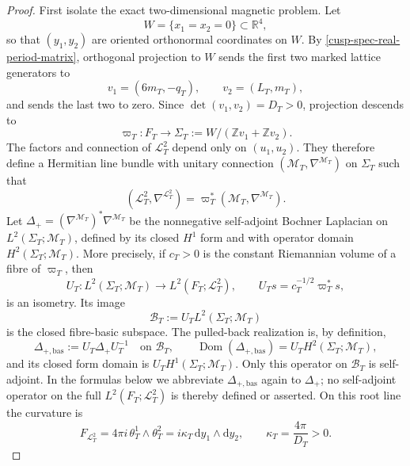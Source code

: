 \begin{proof}
First isolate the exact two-dimensional magnetic problem.  Let
\[
 W=\{x_1=x_2=0\}\subset\mathbb R^4,
\]
so that \((y_1,y_2)\) are oriented orthonormal coordinates on \(W\).
By \cref{cusp-spec-real-period-matrix}, orthogonal projection to \(W\)
sends the first two marked lattice generators to
\[
 v_1=(6m_T,-q_T),
 \qquad
 v_2=(L_T,m_T),
\]
and sends the last two to zero.  Since
\(\det(v_1,v_2)=D_T>0\), projection descends to
\[
 \varpi_T:F_T\longrightarrow
 \Sigma_T:=W/(\mathbb Zv_1+\mathbb Zv_2).
\]
The factors and connection of \(\mathscr L_T^2\) depend only on
\((u_1,u_2)\).  They therefore define a Hermitian line bundle with unitary
connection \((\mathscr M_T,\nabla^{\mathscr M_T})\) on \(\Sigma_T\) such
that
\begin{equation}
 (\mathscr L_T^2,\nabla^{\mathscr L_T^2})
 =\varpi_T^*(\mathscr M_T,\nabla^{\mathscr M_T}).
 \label{cusp-magnetic-descended-root-line}
\end{equation}
Let \(\Delta_+=(\nabla^{\mathscr M_T})^*\nabla^{\mathscr M_T}\) be the
nonnegative self-adjoint Bochner Laplacian on
\(L^2(\Sigma_T;\mathscr M_T)\), defined by its closed \(H^1\) form and
with operator domain \(H^2(\Sigma_T;\mathscr M_T)\).  More precisely, if
\(c_T>0\) is the constant Riemannian volume of a fibre of \(\varpi_T\),
then
\[
 U_T:L^2(\Sigma_T;\mathscr M_T)\longrightarrow
       L^2(F_T;\mathscr L_T^2),
 \qquad U_Ts=c_T^{-1/2}\varpi_T^*s,
\]
is an isometry.  Its image
\[
 \mathscr B_T:=U_TL^2(\Sigma_T;\mathscr M_T)
\]
is the closed fibre-basic subspace.  The pulled-back realization is,
by definition,
\[
 \Delta_{+,\mathrm{bas}}:=U_T\Delta_+U_T^{-1}
 \quad\text{on }\mathscr B_T,
 \qquad
 \operatorname{Dom}(\Delta_{+,\mathrm{bas}})
 =U_TH^2(\Sigma_T;\mathscr M_T),
\]
and its closed form domain is \(U_TH^1(\Sigma_T;\mathscr M_T)\).
Only this operator on \(\mathscr B_T\) is self-adjoint.  In the formulas
below we abbreviate \(\Delta_{+,\mathrm{bas}}\) again to \(\Delta_+\);
no self-adjoint operator on the full
\(L^2(F_T;\mathscr L_T^2)\) is thereby defined or asserted.  On this
root line the curvature is
\begin{equation}
 F_{\mathscr L_T^2}
 =4\pi i\,\theta_T^1\wedge\theta_T^2
 =i\kappa_T\,\mathrm dy_1\wedge\mathrm dy_2,
 \qquad
 \kappa_T=\frac{4\pi}{D_T}>0.
 \label{cusp-magnetic-root-field-strength}
\end{equation}


\end{proof}
